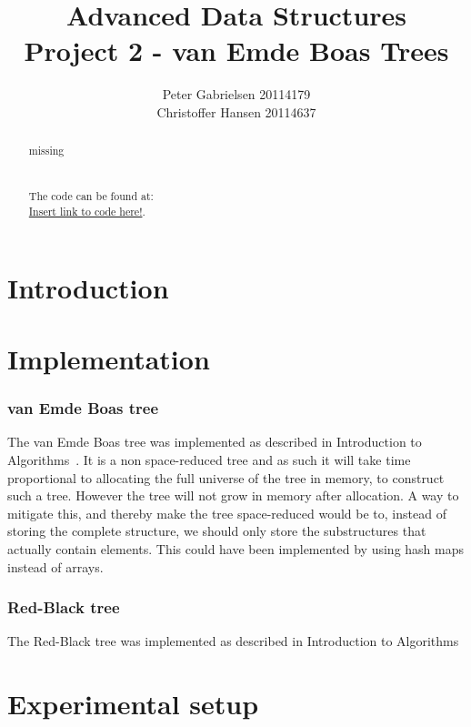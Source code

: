 \documentclass[a4paper,oneside,article,11pt]{memoir}
\title{Advanced Data Structures \\ Project 2 - van Emde Boas Trees}
\author{Peter Gabrielsen 20114179 \\
Christoffer Hansen 20114637}
\begin{document}
\begin{titlingpage}
\clearpage

\maketitle
\thispagestyle{empty}

\begin{abstract}
missing
\\
\\
\\
The code can be found at: \\\url{Insert link to code here!}.
\end{abstract}
\end{titlingpage}

\pagebreak

\tableofcontents

\pagebreak

\chapter{Introduction}


\chapter{Implementation}
\label{cpt:implementation}


\subsection{van Emde Boas tree}
The van Emde Boas tree was implemented as described in Introduction to Algorithms~\cite{clrs}. It is a non space-reduced tree and as such it will take time proportional to allocating the full universe of the tree in memory, to construct such a tree. However the tree will not grow in memory after allocation. A way to mitigate this, and thereby make the tree space-reduced would be to, instead of storing the complete structure, we should only store the substructures that actually contain elements. This could have been implemented by using hash maps instead of arrays.

\subsection{Red-Black tree}
The Red-Black tree was implemented as described in Introduction to Algorithms~\cite{clrs}

\chapter{Experimental setup}
\label{chtp:experiment_setup}
\end{document}
